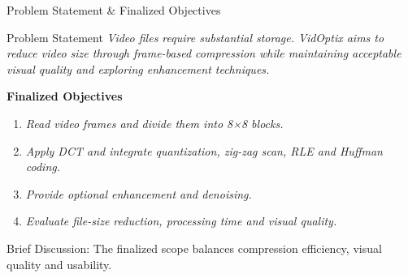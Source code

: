 \documentclass[aspectratio=169,11pt]{beamer}
\newcommand{\smallnote}[1]{%
\vspace{0.08cm}
{\scriptsize\color{GEUGrey}#1}
}
\newcommand{\placeholder}[1]{%
\textit{\color{GEUGrey}#1}
}
\begin{document}
\begin{frame}{Problem Statement \& Finalized Objectives}

\begin{block}{Problem Statement}
\placeholder{
Video files require substantial storage. VidOptix aims to reduce video size through frame-based compression while maintaining acceptable visual quality and exploring enhancement techniques.
}
\end{block}

\vspace{2mm}

\textbf{\color{GEUBlue}Finalized Objectives}

\begin{enumerate}\itemsep3pt
\item \placeholder{Read video frames and divide them into 8×8 blocks.}
\item \placeholder{Apply DCT and integrate quantization, zig-zag scan, RLE and Huffman coding.}
\item \placeholder{ Provide optional enhancement and denoising.}
\item \placeholder{Evaluate file-size reduction, processing time and visual quality.}
\end{enumerate}

\vfill

\smallnote{
Brief Discussion: The finalized scope balances compression efficiency, visual quality and usability.
}

\end{frame}
\end{document}
